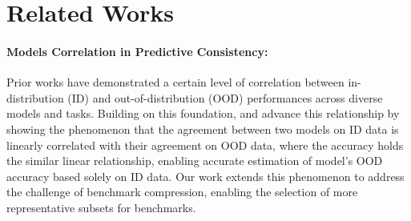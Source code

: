 
\appendix
\section{Related Works}
\label{apd:related_works}
\paragraph{Models Correlation in Predictive Consistency:} Prior works \citep{taori2020measuring, miller2021accuracy, awadalla2022exploring} have demonstrated a certain level of correlation between in-distribution (ID) and out-of-distribution (OOD) performances across diverse models and tasks. Building on this foundation, \cite{baek2022agreement} and \cite{mehra2024predicting} advance this relationship by showing the phenomenon that the agreement between two models on ID data is linearly correlated with their agreement on OOD data, where the accuracy holds the similar linear relationship, enabling accurate estimation of model's OOD accuracy based solely on ID data. Our work extends this phenomenon to address the challenge of benchmark compression, enabling the selection of more representative subsets for benchmarks. 

